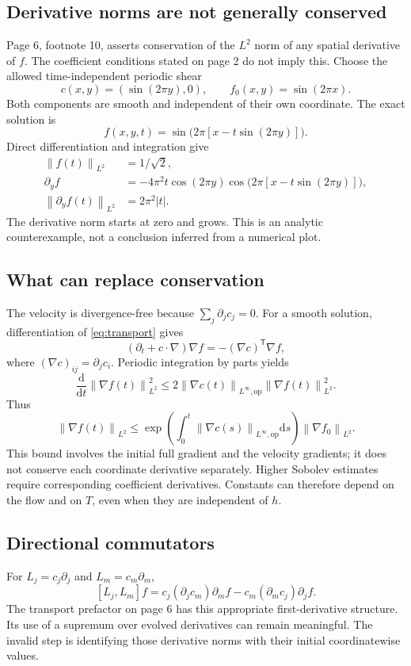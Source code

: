 \documentclass[11pt]{article}
\newcommand{\norm}[1]{\left\lVert #1\right\rVert}
\newcommand{\dd}{\mathrm d}
\begin{document}
\subsection{Derivative norms are not generally conserved}
Page 6, footnote 10, asserts conservation of the $L^2$ norm of any
spatial derivative of $f$. The coefficient conditions stated on page 2
do not imply this. Choose the allowed time-independent periodic shear
\[
 c(x,y)=(\sin(2\pi y),0),\qquad f_0(x,y)=\sin(2\pi x).
\]
Both components are smooth and independent of their own coordinate.
The exact solution is
\[
 f(x,y,t)=\sin\bigl(2\pi[x-t\sin(2\pi y)]\bigr).
\]
Direct differentiation and integration give
\begin{align}
 \norm{f(t)}_{L^2}&=1/\sqrt2,\\
 \partial_y f&=-4\pi^2t\cos(2\pi y)
       \cos\bigl(2\pi[x-t\sin(2\pi y)]\bigr),\\
 \norm{\partial_yf(t)}_{L^2}&=2\pi^2|t|.
\end{align}
The derivative norm starts at zero and grows. This is an analytic
counterexample, not a conclusion inferred from a numerical plot.

\subsection{What can replace conservation}
The velocity is divergence-free because $\sum_j\partial_jc_j=0$.
For a smooth solution, differentiation of \eqref{eq:transport} gives
\[
 (\partial_t+c\cdot\nabla)\nabla f=-(\nabla c)^{\mathsf T}\nabla f,
\]
where $(\nabla c)_{ij}=\partial_jc_i$. Periodic integration
by parts yields
\[
 \frac{\dd}{\dd t}\norm{\nabla f(t)}_{L^2}^2
 \leq 2\norm{\nabla c(t)}_{L^\infty,\mathrm{op}}
                 \norm{\nabla f(t)}_{L^2}^2 .
\]
Thus
\[
 \norm{\nabla f(t)}_{L^2}\leq
 \exp\!\left(\int_0^t\norm{\nabla c(s)}_{L^\infty,\mathrm{op}}\dd s\right)
 \norm{\nabla f_0}_{L^2}.
\]
This bound involves the initial full gradient and the velocity gradients;
it does not conserve each coordinate derivative separately.
Higher Sobolev estimates require corresponding coefficient derivatives.
Constants can therefore depend on the flow and on $T$, even when they
are independent of $h$.

\subsection{Directional commutators}
For $L_j=c_j\partial_j$ and $L_m=c_m\partial_m$,
\[
 [L_j,L_m]f=
 c_j(\partial_j c_m)\partial_mf-
 c_m(\partial_mc_j)\partial_jf.
\]
The transport prefactor on page 6 has this appropriate first-derivative
structure. Its use of a supremum over evolved derivatives can remain
meaningful. The invalid step is identifying those derivative norms with
their initial coordinatewise values.
\end{document}
